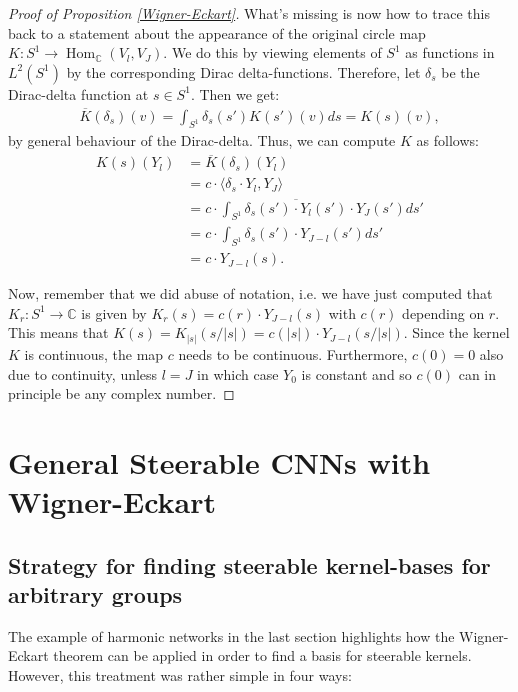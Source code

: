 \documentclass[12pt, a4paper]{article}
\theoremstyle{plain}
\theoremstyle{definition}
\theoremstyle{remark}
\newcommand{\C}{\mathds{C}}
\DeclareMathOperator{\Hom}{Hom}
\begin{document}
\begin{proof}[Proof of Proposition \ref{Wigner-Eckart}]
What's missing is now how to trace this back to a statement about the appearance of the original circle map $K: S^1 \to \Hom_{\C}(V_l, V_J)$. We do this by viewing elements of $S^1$ as functions in $L^2\left(S^1\right)$ by the corresponding Dirac delta-functions. Therefore, let $\delta_s$ be the Dirac-delta function at $s \in S^1$. Then we get:
\begin{align*}
\overline{K}(\delta_s)(v) = \int_{S^1} \delta_s(s') K(s')(v)ds = K(s)(v),
\end{align*}
by general behaviour of the Dirac-delta. Thus, we can compute $K$ as follows:
\begin{align*}
K(s)(Y_l) & = \overline{K}(\delta_s)(Y_l) \\
& = c \cdot \langle \delta_s \cdot Y_l , Y_{J} \rangle \\
& = c \cdot \int_{S^1} \overline{\delta_s(s')\cdot Y_l(s')} \cdot Y_{J}(s') ds' \\
& = c \cdot \int_{S^1} \delta_s(s') \cdot Y_{J-l}(s') ds' \\
& = c \cdot Y_{J-l}(s).
\end{align*}

Now, remember that we did abuse of notation, i.e. we have just computed that $K_r: S^1 \to \C$ is given by $K_r(s) = c(r) \cdot Y_{J-l}(s)$ with $c(r)$ depending on $r$. This means that $K(s) = K_{|s|}(s/|s|) = c(|s|) \cdot Y_{J-l}(s/|s|)$. Since the kernel $K$ is continuous, the map $c$ needs to be continuous. Furthermore, $c(0) = 0$ also due to continuity, unless $l = J$ in which case $Y_0$ is constant and so $c(0)$ can in principle be any complex number.

\end{proof}

\section{General Steerable CNNs with Wigner-Eckart}

\subsection{Strategy for finding steerable kernel-bases for arbitrary groups}

The example of harmonic networks in the last section highlights how the Wigner-Eckart theorem can be applied in order to find a basis for steerable kernels. However, this treatment was rather simple in four ways:
\end{document}
